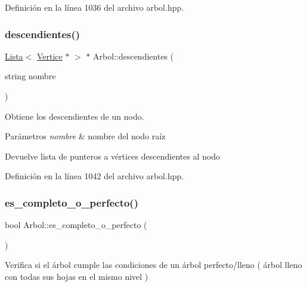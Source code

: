 Definición en la línea 1036 del archivo arbol.\+hpp.

\mbox{\label{classArbol_a790b07f284b14bd179499eb4a991ad86}} 
\subsubsection{\texorpdfstring{descendientes()}{descendientes()}\hspace{0.1cm}{\footnotesize\ttfamily [2/2]}}
{\footnotesize\ttfamily \hyperlink{classLista}{Lista}$<$ \hyperlink{classVertice}{Vertice} $\ast$ $>$ $\ast$ Arbol\+::descendientes (\begin{DoxyParamCaption}\item[{string}]{nombre }\end{DoxyParamCaption})}



Obtiene los descendientes de un nodo. 


\begin{DoxyParams}{Parámetros}
{\em nombre} & nombre del nodo raíz \\
\hline
\end{DoxyParams}
\begin{DoxyReturn}{Devuelve}
lista de punteros a vértices descendientes al nodo 
\end{DoxyReturn}


Definición en la línea 1042 del archivo arbol.\+hpp.

\mbox{\label{classArbol_a9e472df85f3bb1aa5c90f8157ad6ff22}} 
\subsubsection{\texorpdfstring{es\+\_\+completo\+\_\+o\+\_\+perfecto()}{es\_completo\_o\_perfecto()}}
{\footnotesize\ttfamily bool Arbol\+::es\+\_\+completo\+\_\+o\+\_\+perfecto (\begin{DoxyParamCaption}{ }\end{DoxyParamCaption})}



Verifica si el árbol cumple las condiciones de un árbol perfecto/lleno ( árbol lleno con todas sus hojas en el mismo nivel ) 

